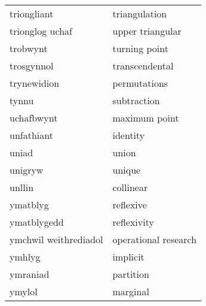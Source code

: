 \begin{supertabular}{p{0.22\textwidth}p{0.22\textwidth}}
                     triongliant &                     triangulation \\
                 trionglog uchaf &                  upper triangular \\
                        trobwynt &                     turning point \\
                      trosgynnol &                    transcendental \\
                     trynewidion &                      permutations \\
                           tynnu &                       subtraction \\
                      uchafbwynt &                     maximum point \\
                      unfathiant &                          identity \\
                           uniad &                             union \\
                         unigryw &                            unique \\
                          unllin &                         collinear \\
                        ymatblyg &                         reflexive \\
                     ymatblygedd &                       reflexivity \\
           ymchwil weithrediadol &              operational research \\
                          ymhlyg &                          implicit \\
                        ymraniad &                         partition \\
                          ymylol &                          marginal \\
\end{supertabular}
